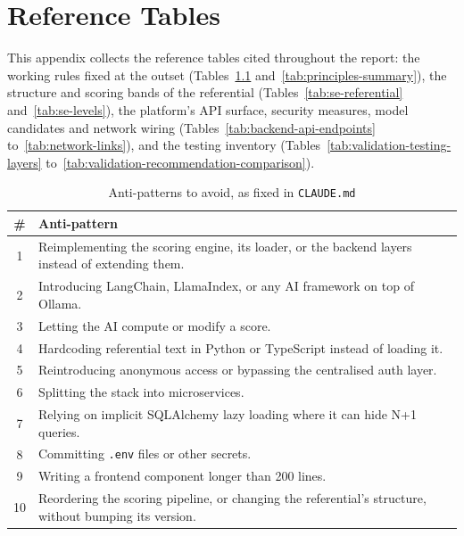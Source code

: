 \chapter{Reference Tables}
\label{app:tables}

This appendix collects the reference tables cited throughout the report: the working rules
fixed at the outset (Tables~\ref{tab:anti-patterns} and~\ref{tab:principles-summary}), the
structure and scoring bands of the referential (Tables~\ref{tab:se-referential}
and~\ref{tab:se-levels}), the platform's API surface, security measures, model candidates and
network wiring (Tables~\ref{tab:backend-api-endpoints} to~\ref{tab:network-links}), and the
testing inventory (Tables~\ref{tab:validation-testing-layers}
to~\ref{tab:validation-recommendation-comparison}).


\begin{table}[htbp]
  \centering
  \begin{tabular}{@{}cp{}@{}}
    \toprule
    \# & Anti-pattern \\
    \midrule
    1 & Reimplementing the scoring engine, its loader, or the backend layers instead of extending them. \\
    2 & Introducing LangChain, LlamaIndex, or any AI framework on top of Ollama. \\
    3 & Letting the AI compute or modify a score. \\
    4 & Hardcoding referential text in Python or TypeScript instead of loading it. \\
    5 & Reintroducing anonymous access or bypassing the centralised auth layer. \\
    6 & Splitting the stack into microservices. \\
    7 & Relying on implicit SQLAlchemy lazy loading where it can hide N+1 queries. \\
    8 & Committing \texttt{.env} files or other secrets. \\
    9 & Writing a frontend component longer than 200 lines. \\
    10 & Reordering the scoring pipeline, or changing the referential's structure, without bumping its version. \\
    \bottomrule
  \end{tabular}
  \caption{Anti-patterns to avoid, as fixed in \texttt{CLAUDE.md}}
  \label{tab:anti-patterns}
\end{table}

